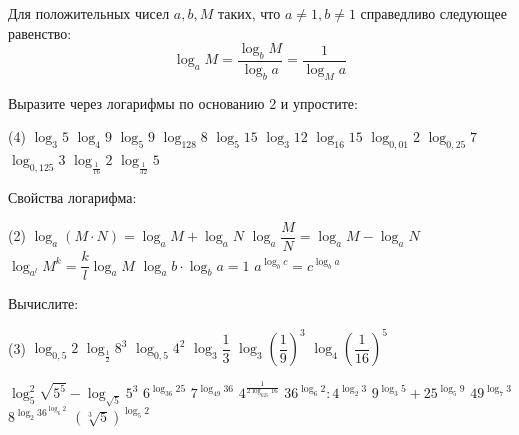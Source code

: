 \begin{class}[number=6]
	\begin{definit}
		Для положительных чисел \( a, b, M \) таких, что \( a \neq 1, b \neq 1 \) справедливо следующее равенство: \[ \log_a M = \dfrac{\log_b M}{\log_b a} = \dfrac{1}{\log_M a} \]
	\end{definit}
	\begin{listofex}
		\item Выразите через логарифмы по основанию \(2\) и упростите:
		\begin{tasks}(4)
			\task \( \log_3 5 \)
			\task \( \log_4 9 \)
			\task \( \log_5 9 \)
			\task \( \log_{128} 8 \)
			\task \( \log_5 15 \)
			\task \( \log_3 12 \)
			\task \( \log_{16} 15 \)
			\task \( \log_{0,01} 2 \)
			\task \( \log_{0,25} 7 \)
			\task \( \log_{0,125} 3 \)
			\task \( \log_{\frac{1}{16}} 2 \)
			\task \( \log_{\frac{1}{32}} 5 \)
		\end{tasks}
	\end{listofex}
	\begin{definit}
		Свойства логарифма:
		\begin{tasks}(2)
			\task \( \log_a(M \cdot N) = \log_a M + \log_a N \)
			\task \( \log_a \dfrac{M}{N} = \log_a M - \log_a N \)
			\task \( \log_{a^l} M^k=\dfrac{k}{l}\log_a M \)
			\task \( \log_a b \cdot \log_b a = 1 \)
			\task \( a^{\log_b c}=c^{\log_b a} \)
		\end{tasks}
		
	\end{definit}
	\begin{listofex}[resume]
		\item Вычислите:
		\begin{tasks}(3)
			\task \( \log_{0,5}2 \)
			\task \( \log_{\frac{1}{2}}8^3 \)
			\task \( \log_{0,5}4^2 \)
			\task \( \log_3 \dfrac{1}{3} \)
			\task \( \log_3 \left(  \dfrac{1}{9} \right)^3 \)
			\task \( \log_4 \left(  \dfrac{1}{16} \right)^5 \)
			
			\task \( \log^2_5 \sqrt{5^5} - \log_{\sqrt{5}}5^3 \)
			\task \( 6^{\log_{36} 25} \)
			\task \( 7^{\log_{49} 36} \)
			\task \( 4^{\tfrac{1}{2\log_{625} 16 }} \)
			\task \( 36^{\log_6 2}:4^{\log_2 3} \)
			\task \( 9^{\log_3 5}+25^{\log_5 9} \)
			\task \( 49^{\log_7 3} \)
			\task \( 8^{\log_2 36^{\log_6 2}} \)
			\task \( (\sqrt[3]{5})^{\log_5 2} \)
			

\end{tasks}
\end{listofex}
\end{class}
